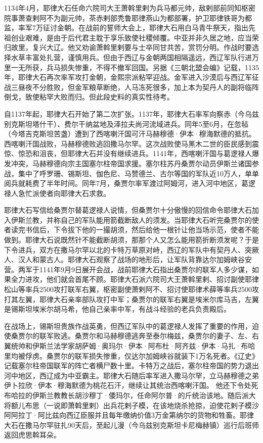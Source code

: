 1134年4月，耶律大石任命六院司大王萧斡里剌为兵马都元帅，敌剌部前同知枢密院事萧查剌阿不为副元帅，茶赤剌部秃鲁耶律燕山为都部署，护卫耶律铁哥为都监，率军7万征讨金朝。在战前的誓师大会上，耶律大石用白马青牛祭天，指出先祖创业艰难，是由于后代君主耽于享乐致使社稷倾覆。中亚并非久居之地，应当荣归故里，复兴大辽。他又劝谕萧斡里剌要与士卒同甘共苦，赏罚分明。作战时要选择水草丰富处扎营，谨慎用兵。但由于西辽与金朝两国相隔遥远，西辽军队行进万里一无所获，兵马损失惨重，不得不撤军回国。另据《三朝北盟会编》记载，1135年，耶律大石再次率军攻打金朝，金熙宗派粘罕迎战。金军进入沙漠后与西辽军征战三昼夜不分胜败，但金军粮草断绝，人马冻死很多，加上本为契丹人的副将临阵倒戈，致使粘罕大败而归。但此段史料的真实性待考。

自1137年起，耶律大石开始了第二次扩张。1137年，耶律大石率军向察赤（今乌兹别克斯坦塔什干）、费尔干纳盆地及泽拉夫尚河流域进兵。同年5至6月，在忽毡（今塔吉克斯坦苦盏）遭到了西喀喇汗国可汗马赫穆德·伊本·穆海默德的抵抗。西喀喇汗国战败，马赫穆德败逃回撒马尔罕。这次战败使马黑木二世的臣民感到震惊、惊恐和沮丧，但耶律大石并没有继续进兵。1141年，西喀喇汗国与葛逻禄人爆发冲突，马赫穆德向宗主国塞尔柱帝国求援。塞尔柱苏丹桑贾尔动员伊斯兰诸国参战，集中了呼罗珊、锡斯坦、伽色尼、马赞德兰、古尔等国的军队近10万人，单单阅兵就耗费了半年时间。同年7月，桑贾尔率军渡过阿姆河，进入河中地区，葛逻禄人急忙派使者向耶律大石求救。

耶律大石写信给桑贾尔替葛逻禄人说情，但桑贾尔十分傲慢的回信命令耶律大石加入伊斯兰教，并称自己的军队能用箭截断敌人的须发。当耶律大石听完桑贾尔的使者读完书信后，下令拔下他的一撮胡须，然后给他一根针让他当场示范，使者不能做到。耶律大石说既然针不能截断胡须，那那个人又怎么能用箭折断须发呢？于是下令进兵，双方在撒马尔罕以北的卡特万草原对峙，西辽的军队中有契丹人、突厥人、汉人和蒙古人。耶律大石观察了战场的地形后，让军队背靠达尔加姆峡谷安营。两军于1141年9月9日展开会战，战前耶律大石指出桑贾尔的联军人多少谋，如果全力进攻，他们就会首尾不顾。耶律大石派六院司大王萧斡里剌、招讨副使耶律松山等率兵2500攻打联军右翼，枢密副使萧剌阿不、招讨使耶律术薛等率兵2500攻打其左翼，耶律大石亲率部队攻打中军；桑贾尔的联军右翼是埃米尔库马吉，左翼是锡斯坦埃米尔胡马希，他自己亲率中军，有战斗经验的老兵负责殿后。

在战场上，锡斯坦贵族作战英勇，但西辽军队中的葛逻禄人发挥了重要的作用，迫使桑贾尔的联军败逃。桑贾尔和马赫穆德逃奔至泰尔梅兹，桑贾尔的妻子、左、右翼统帅和伊斯兰法学家胡萨姆·奥玛尔·伊本·阿布杜·阿齐兹·伊本·马扎·布哈里均被俘虏。桑贾尔的联军损失惨重，仅达尔加姆峡谷就装下1万名死者。《辽史》记载塞尔柱帝国联军的阵亡者横尸数十里。卡特万之战后，塞尔柱帝国的势力退出河中地区，西辽成为中亚霸主。耶律大石随后率军进入撒马尔罕，立马赫穆德之弟伊卜拉欣·伊本·穆海默德为桃花石汗，继续让其统治西喀喇汗国。 他还下令处死布哈拉的伊斯兰教教长胡沙穆丁·倭玛尔，任命阿尔普·的斤统治该地。随后派大将额儿布思（一说即萧斡里剌）出兵花剌子模，在该地烧杀抢掠，迫使花剌子模沙阿阿拉丁·阿比兹向西辽臣服并且每年缴纳价值3万金第纳尔的货物和牲畜。耶律大石在撒马尔罕驻扎90天后，至起儿漫（今乌兹别克斯坦卡尼梅赫镇）巡行后班师返回虎思斡耳朵。

